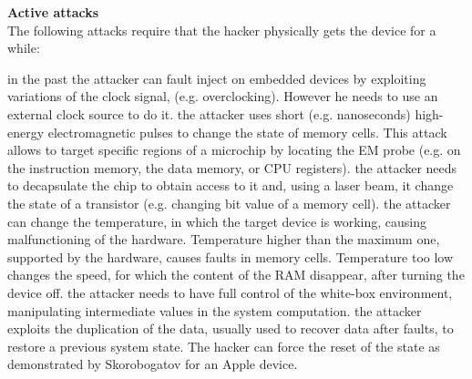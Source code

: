 \textbf{Active attacks}\\
The following attacks require that the hacker physically gets the device for a while:
\begin{itemize}
{in the past the attacker can fault inject on embedded devices by exploiting variations of the clock signal, (e.g. overclocking). However he needs to use an external clock source to do it.}
{the attacker uses short (e.g. nanoseconds) high-energy electromagnetic pulses to change the state of memory cells. This attack allows to target specific regions of a microchip by locating the EM probe (e.g. on the instruction memory, the data memory, or CPU registers).}
{the attacker needs to decapsulate the chip to obtain access to it and, using a laser beam, it change the state of a transistor (e.g. changing bit value of a memory cell).}
{the attacker can change the temperature, in which the target device is working, causing malfunctioning of the hardware. Temperature higher than the maximum one, supported by the hardware, causes faults in memory cells. Temperature too low changes the speed, for which the content of the RAM disappear, after turning the device off.}
{the attacker needs to have full control of the white-box environment, manipulating intermediate values in the system computation.}
{the attacker exploits the duplication of the data, usually used to recover data after faults, to restore a previous system state. The hacker can force the reset of the state as demonstrated by Skorobogatov for an Apple device\cite{side_Apple}.}
\end{itemize}

